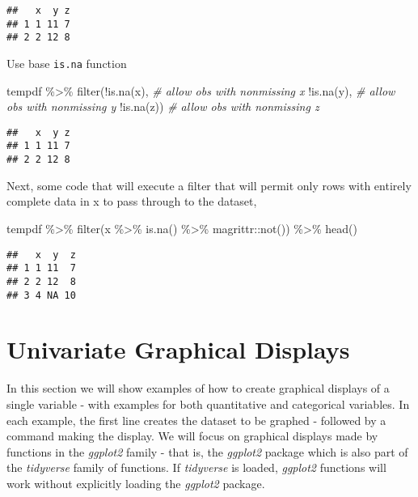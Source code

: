 \documentclass[
]{book}
\newenvironment{Shaded}{\begin{snugshade}}{\end{snugshade}}
\newcommand{\CommentTok}[1]{\textcolor[rgb]{0.56,0.35,0.01}{\textit{#1}}}
\newcommand{\FunctionTok}[1]{\textcolor[rgb]{0.00,0.00,0.00}{#1}}
\newcommand{\NormalTok}[1]{#1}
\newcommand{\SpecialCharTok}[1]{\textcolor[rgb]{0.00,0.00,0.00}{#1}}
\begin{document}
\begin{verbatim}
##   x  y z
## 1 1 11 7
## 2 2 12 8
\end{verbatim}

Use base \texttt{is.na} function

\begin{Shaded}
\begin{Highlighting}[]
\NormalTok{tempdf }\SpecialCharTok{\%\textgreater{}\%}
  \FunctionTok{filter}\NormalTok{(}\SpecialCharTok{!}\FunctionTok{is.na}\NormalTok{(x),  }\CommentTok{\# allow obs with nonmissing x}
         \SpecialCharTok{!}\FunctionTok{is.na}\NormalTok{(y),  }\CommentTok{\# allow obs with nonmissing y}
         \SpecialCharTok{!}\FunctionTok{is.na}\NormalTok{(z))  }\CommentTok{\# allow obs with nonmissing z}
\end{Highlighting}
\end{Shaded}

\begin{verbatim}
##   x  y z
## 1 1 11 7
## 2 2 12 8
\end{verbatim}

Next, some code that will execute a filter that will permit only rows with entirely complete data in x to pass through to the dataset,

\begin{Shaded}
\begin{Highlighting}[]
\NormalTok{tempdf }\SpecialCharTok{\%\textgreater{}\%}
  \FunctionTok{filter}\NormalTok{(x }\SpecialCharTok{\%\textgreater{}\%} \FunctionTok{is.na}\NormalTok{() }\SpecialCharTok{\%\textgreater{}\%}\NormalTok{ magrittr}\SpecialCharTok{::}\FunctionTok{not}\NormalTok{()) }\SpecialCharTok{\%\textgreater{}\%}
  \FunctionTok{head}\NormalTok{()}
\end{Highlighting}
\end{Shaded}

\begin{verbatim}
##   x  y  z
## 1 1 11  7
## 2 2 12  8
## 3 4 NA 10
\end{verbatim}

\hypertarget{UnivariateGraphicalDisplays}{%
\chapter{Univariate Graphical Displays}\label{UnivariateGraphicalDisplays}}

In this section we will show examples of how to create graphical displays of a single variable - with examples for both quantitative and categorical variables.
In each example, the first line creates the dataset to be graphed - followed by a command making the display. We will focus on graphical displays made by functions in the \emph{ggplot2} family - that is, the \emph{ggplot2} package which is also part of the \emph{tidyverse} family of functions. If \emph{tidyverse} is loaded, \emph{ggplot2} functions will work without explicitly loading the \emph{ggplot2} package.
\end{document}
